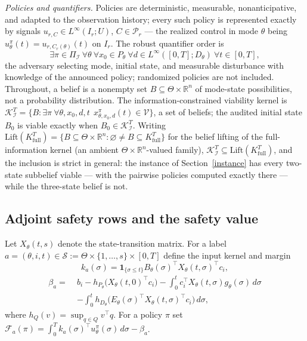 \documentclass[10pt,twocolumn]{article}
\theoremstyle{plain}
\theoremstyle{definition}
\theoremstyle{remark}
\begin{document}
\emph{Policies and quantifiers.} Policies are deterministic, measurable,
nonanticipative, and adapted to the observation history; every such policy is
represented exactly by signals \(u_{r,C} \in L^\infty(I_r; U)\),
\(C \in \mathcal{P}_r\) --- the realized control in mode \(\theta\) being
\(u^{\pi}_\theta(t) = u_{r, C_r(\theta)}(t)\) on \(I_r\). The robust quantifier order is
\[
\exists \pi \in \Pi_{\mathcal{I}}\ \forall \theta\ \forall x_0 \in P_\theta\
\forall d \in L^\infty([0,T]; D_\theta)\ \forall t \in [0,T],
\]
the adversary selecting mode, initial state, and measurable disturbance with
knowledge of the announced policy; randomized policies are not included. Throughout, a belief is a nonempty set \(B \subseteq \Theta \times
\mathbb{R}^n\) of mode-state possibilities, not a probability
distribution. The information-constrained viability kernel is
\(\mathcal{K}_{\mathcal{I}}^T = \{ B : \exists \pi\ \forall \theta, x_0,
d, t\ \ x^{\pi}_{\theta, x_0, d}(t) \in \mathcal{V} \}\), a set of
beliefs; the audited initial state \(B_0\) is viable exactly when
\(B_0 \in \mathcal{K}_{\mathcal{I}}^T\). Writing
\(\mathrm{Lift}(K^T_{\mathrm{full}}) = \{ B \subseteq \Theta \times
\mathbb{R}^n : \varnothing \ne B \subseteq K^T_{\mathrm{full}} \}\) for
the belief lifting of the full-information kernel (an ambient
\(\Theta \times \mathbb{R}^n\)-valued family), \(\mathcal{K}_{\mathcal{I}}^T \subseteq
\mathrm{Lift}(K^T_{\mathrm{full}})\), and the inclusion is strict in general:
the instance of Section~\ref{instance} has every two-state subbelief
viable --- with the pairwise policies computed exactly there --- while the
three-state belief is not.

\subsection{Adjoint safety rows and the safety value}\label{rows}

Let \(X_\theta(t,s)\) denote the state-transition matrix. For a label
\(a = (\theta, i, t) \in \mathscr{S} := \Theta \times \{1,\dots,s\} \times
[0,T]\) define the input kernel and margin
\[
k_a(\sigma) = \mathbf{1}_{\{\sigma \le t\}} B_\theta(\sigma)^\top
X_\theta(t,\sigma)^\top c_i,
\]
\begin{align*}
\beta_a = \;& b_i - h_{P_\theta}\!\bigl(X_\theta(t,0)^\top c_i\bigr)
- \int_0^t c_i^\top X_\theta(t,\sigma) g_\theta(\sigma)\, d\sigma\\
& - \int_0^t h_{D_\theta}\!\bigl(E_\theta(\sigma)^\top
X_\theta(t,\sigma)^\top c_i\bigr)\, d\sigma,
\end{align*}
where \(h_Q(v) = \sup_{q \in Q} v^\top q\). For a policy \(\pi\) set
\(\mathcal{F}_a(\pi) = \int_0^T k_a(\sigma)^\top u^\pi_\theta(\sigma)\,
d\sigma - \beta_a\).
\end{document}
